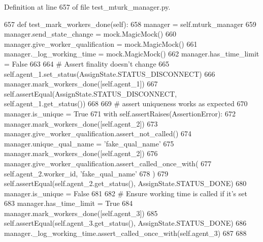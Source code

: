Definition at line 657 of file test\+\_\+mturk\+\_\+manager.\+py.


\begin{DoxyCode}
657     \textcolor{keyword}{def }test\_mark\_workers\_done(self):
658         manager = self.mturk\_manager
659         manager.send\_state\_change = mock.MagicMock()
660         manager.give\_worker\_qualification = mock.MagicMock()
661         manager.\_log\_working\_time = mock.MagicMock()
662         manager.has\_time\_limit = \textcolor{keyword}{False}
663 
664         \textcolor{comment}{# Assert finality doesn't change}
665         self.agent\_1.set\_status(AssignState.STATUS\_DISCONNECT)
666         manager.mark\_workers\_done([self.agent\_1])
667         self.assertEqual(AssignState.STATUS\_DISCONNECT, self.agent\_1.get\_status())
668 
669         \textcolor{comment}{# assert uniqueness works as expected}
670         manager.is\_unique = \textcolor{keyword}{True}
671         with self.assertRaises(AssertionError):
672             manager.mark\_workers\_done([self.agent\_2])
673         manager.give\_worker\_qualification.assert\_not\_called()
674         manager.unique\_qual\_name = \textcolor{stringliteral}{'fake\_qual\_name'}
675         manager.mark\_workers\_done([self.agent\_2])
676         manager.give\_worker\_qualification.assert\_called\_once\_with(
677             self.agent\_2.worker\_id, \textcolor{stringliteral}{'fake\_qual\_name'}
678         )
679         self.assertEqual(self.agent\_2.get\_status(), AssignState.STATUS\_DONE)
680         manager.is\_unique = \textcolor{keyword}{False}
681 
682         \textcolor{comment}{# Ensure working time is called if it's set}
683         manager.has\_time\_limit = \textcolor{keyword}{True}
684         manager.mark\_workers\_done([self.agent\_3])
685         self.assertEqual(self.agent\_3.get\_status(), AssignState.STATUS\_DONE)
686         manager.\_log\_working\_time.assert\_called\_once\_with(self.agent\_3)
687 
688 
\end{DoxyCode}
\mbox{\label{classparlai_1_1mturk_1_1core_1_1dev_1_1test_1_1test__mturk__manager_1_1TestMTurkManagerUnitFunctions_a9842f2d20f095174c0c1e690a14f1311}} 
